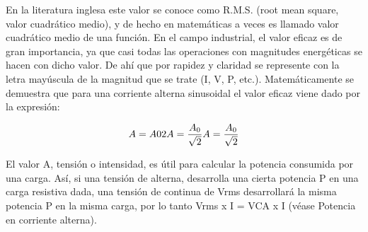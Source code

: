 \documentclass{article}
\begin{document}
En la literatura inglesa este valor se conoce como R.M.S. (root mean square, valor cuadrático medio), y de hecho en matemáticas a veces es llamado valor cuadrático medio de una función. En el campo industrial, el valor eficaz es de gran importancia, ya que casi todas las operaciones con magnitudes energéticas se hacen con dicho valor. De ahí que por rapidez y claridad se represente con la letra mayúscula de la magnitud que se trate (I, V, P, etc.). Matemáticamente se demuestra que para una corriente alterna sinusoidal el valor eficaz viene dado por la expresión:

\begin{equation}
       A = A 0 2 {\displaystyle A={A_{0} \over {\sqrt {2}}}} A={A_{0} \over {{\sqrt 2}}}
\end{equation}

El valor A, tensión o intensidad, es útil para calcular la potencia consumida por una carga. Así, si una tensión de alterna, desarrolla una cierta potencia P en una carga resistiva dada, una tensión de continua de Vrms desarrollará la misma potencia P en la misma carga, por lo tanto Vrms x I = VCA x I (véase Potencia en corriente alterna).





\end{document}
